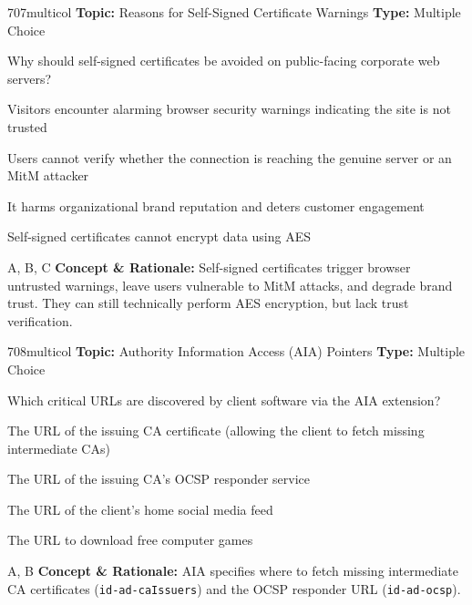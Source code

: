 \begin{qcard}{707}{multicol}
\textcolor{darkslate!75}{\small\textbf{Topic:} Reasons for Self-Signed Certificate Warnings \hfill \textbf{Type:} Multiple Choice}\vspace{0.4em}\par
Why should self-signed certificates be avoided on public-facing corporate web servers?
\begin{qoptions}
\item Visitors encounter alarming browser security warnings indicating the site is not trusted
\item Users cannot verify whether the connection is reaching the genuine server or an MitM attacker
\item It harms organizational brand reputation and deters customer engagement
\item Self-signed certificates cannot encrypt data using AES
\end{qoptions}
\end{qcard}
\nopagebreak
\begin{explainbox}{A, B, C}
\textbf{Concept \& Rationale:} Self-signed certificates trigger browser untrusted warnings, leave users vulnerable to MitM attacks, and degrade brand trust. They can still technically perform AES encryption, but lack trust verification.
\end{explainbox}

\begin{qcard}{708}{multicol}
\textcolor{darkslate!75}{\small\textbf{Topic:} Authority Information Access (AIA) Pointers \hfill \textbf{Type:} Multiple Choice}\vspace{0.4em}\par
Which critical URLs are discovered by client software via the AIA extension?
\begin{qoptions}
\item The URL of the issuing CA certificate (allowing the client to fetch missing intermediate CAs)
\item The URL of the issuing CA's OCSP responder service
\item The URL of the client's home social media feed
\item The URL to download free computer games
\end{qoptions}
\end{qcard}
\nopagebreak
\begin{explainbox}{A, B}
\textbf{Concept \& Rationale:} AIA specifies where to fetch missing intermediate CA certificates (\texttt{id-ad-caIssuers}) and the OCSP responder URL (\texttt{id-ad-ocsp}).
\end{explainbox}

